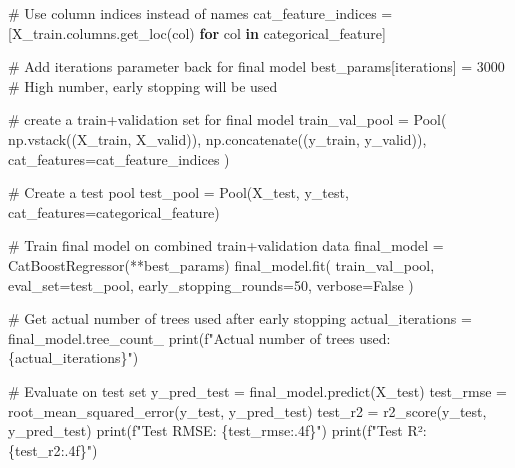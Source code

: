 \documentclass[
  letterpaper,
  DIV=11,
  numbers=noendperiod]{scrreprt}
\newenvironment{Shaded}{\begin{snugshade}}{\end{snugshade}}
\newcommand{\BuiltInTok}[1]{\textcolor[rgb]{0.00,0.23,0.31}{#1}}
\newcommand{\CommentTok}[1]{\textcolor[rgb]{0.37,0.37,0.37}{#1}}
\newcommand{\ControlFlowTok}[1]{\textcolor[rgb]{0.00,0.23,0.31}{\textbf{#1}}}
\newcommand{\DecValTok}[1]{\textcolor[rgb]{0.68,0.00,0.00}{#1}}
\newcommand{\KeywordTok}[1]{\textcolor[rgb]{0.00,0.23,0.31}{\textbf{#1}}}
\newcommand{\NormalTok}[1]{\textcolor[rgb]{0.00,0.23,0.31}{#1}}
\newcommand{\OperatorTok}[1]{\textcolor[rgb]{0.37,0.37,0.37}{#1}}
\newcommand{\SpecialCharTok}[1]{\textcolor[rgb]{0.37,0.37,0.37}{#1}}
\newcommand{\SpecialStringTok}[1]{\textcolor[rgb]{0.13,0.47,0.30}{#1}}
\newcommand{\StringTok}[1]{\textcolor[rgb]{0.13,0.47,0.30}{#1}}
\newcommand{\VariableTok}[1]{\textcolor[rgb]{0.07,0.07,0.07}{#1}}
\begin{document}
\begin{Shaded}
\begin{Highlighting}[]
\CommentTok{\# Use column indices instead of names}
\NormalTok{cat\_feature\_indices }\OperatorTok{=}\NormalTok{ [X\_train.columns.get\_loc(col) }\ControlFlowTok{for}\NormalTok{ col }\KeywordTok{in}\NormalTok{ categorical\_feature]}

\CommentTok{\# Add iterations parameter back for final model}
\NormalTok{best\_params[}\StringTok{\textquotesingle{}iterations\textquotesingle{}}\NormalTok{] }\OperatorTok{=} \DecValTok{3000}  \CommentTok{\# High number, early stopping will be used}

\CommentTok{\# create a train+validation set for final model}
\NormalTok{train\_val\_pool }\OperatorTok{=}\NormalTok{ Pool(}
\NormalTok{    np.vstack((X\_train, X\_valid)),}
\NormalTok{    np.concatenate((y\_train, y\_valid)),}
\NormalTok{    cat\_features}\OperatorTok{=}\NormalTok{cat\_feature\_indices}
\NormalTok{)}

\CommentTok{\# Create a test pool}
\NormalTok{test\_pool }\OperatorTok{=}\NormalTok{ Pool(X\_test, y\_test, cat\_features}\OperatorTok{=}\NormalTok{categorical\_feature)}

\CommentTok{\# Train final model on combined train+validation data}
\NormalTok{final\_model }\OperatorTok{=}\NormalTok{ CatBoostRegressor(}\OperatorTok{**}\NormalTok{best\_params)}
\NormalTok{final\_model.fit(}
\NormalTok{    train\_val\_pool,}
\NormalTok{    eval\_set}\OperatorTok{=}\NormalTok{test\_pool,}
\NormalTok{    early\_stopping\_rounds}\OperatorTok{=}\DecValTok{50}\NormalTok{,}
\NormalTok{    verbose}\OperatorTok{=}\VariableTok{False}
\NormalTok{)}

\CommentTok{\# Get actual number of trees used after early stopping}
\NormalTok{actual\_iterations }\OperatorTok{=}\NormalTok{ final\_model.tree\_count\_}
\BuiltInTok{print}\NormalTok{(}\SpecialStringTok{f"Actual number of trees used: }\SpecialCharTok{\{}\NormalTok{actual\_iterations}\SpecialCharTok{\}}\SpecialStringTok{"}\NormalTok{)}

\CommentTok{\# Evaluate on test set}
\NormalTok{y\_pred\_test }\OperatorTok{=}\NormalTok{ final\_model.predict(X\_test)}
\NormalTok{test\_rmse }\OperatorTok{=}\NormalTok{ root\_mean\_squared\_error(y\_test, y\_pred\_test)}
\NormalTok{test\_r2 }\OperatorTok{=}\NormalTok{ r2\_score(y\_test, y\_pred\_test)}
\BuiltInTok{print}\NormalTok{(}\SpecialStringTok{f"Test RMSE: }\SpecialCharTok{\{}\NormalTok{test\_rmse}\SpecialCharTok{:.4f\}}\SpecialStringTok{"}\NormalTok{)}
\BuiltInTok{print}\NormalTok{(}\SpecialStringTok{f"Test R²: }\SpecialCharTok{\{}\NormalTok{test\_r2}\SpecialCharTok{:.4f\}}\SpecialStringTok{"}\NormalTok{)}
\end{Highlighting}
\end{Shaded}
\end{document}
